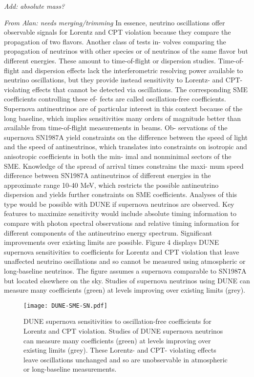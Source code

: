 \textit{Add: absolute mass?}


\textit{From Alan: needs merging/trimming}
 In essence, neutrino oscillations offer observable signals for Lorentz and CPT violation because they compare the propagation of two flavors. Another class of tests in- volves comparing the propagation of neutrinos with other species or of neutrinos of the same flavor but different energies. These amount to time-of-flight or dispersion studies.
Time-of-flight and dispersion effects lack the interferometric resolving power available to neutrino oscillations, but they provide instead sensitivity to Lorentz- and CPT-violating effects that cannot be detected via oscillations. The corresponding SME coefficients controlling these ef- fects are called oscillation-free coefficients.
Supernova antineutrinos are of particular interest in this context because of the long baseline, which implies sensitivities many orders of magnitude better than available from time-of-flight measurements in beams. Ob- servations of the supernova SN1987A yield constraints on the difference between the speed of light and the speed of antineutrinos, which translates into constraints on isotropic and anisotropic coefficients in both the min- imal and nonminimal sectors of the SME. Knowledge of the spread of arrival times constrains the maxi- mum speed difference between SN1987A antineutrinos of different energies in the approximate range 10-40 MeV, which restricts the possible antineutrino dispersion and yields further constraints on SME coefficients.
Analyses of this type would be possible with DUNE if supernova neutrinos are observed. Key features to maximize sensitivity would include absolute timing information to compare with photon spectral observations and relative timing information for different components of the antineutrino energy spectrum. Significant improvements over existing limits are possible.
Figure 4 displays DUNE supernova sensitivities to coefficients for Lorentz and CPT violation that leave unaffected neutrino oscillations and so cannot be measured using atmospheric or long-baseline neutrinos. The figure assumes a supernova comparable to SN1987A but located elsewhere on the sky. Studies of supernova neutrinos using DUNE can measure many coefficients (green) at levels improving over existing limits (grey).

\begin{figure}[!htb]
\centering
\texttt{[image: DUNE-SME-SN.pdf]}
\caption{DUNE supernova sensitivities to oscillation-free coefficients for Lorentz and CPT violation. Studies of DUNE supernova neutrinos can measure many coefficients (green) at levels improving over existing limits (grey). These Lorentz- and CPT- violating effects leave oscillations unchanged and so are unobservable in atmospheric or long-baseline measurements.}
\label{fig:snliv}
\end{figure}

